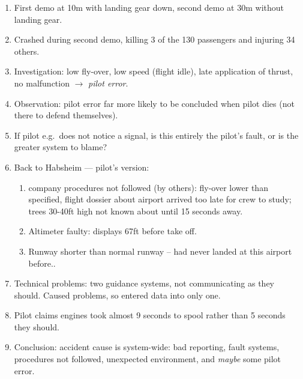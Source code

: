 \documentclass[11pt]{article}
\begin{document}
\begin{enumerate}
\begin{enumerate}
  \item First demo at 10m with landing gear down, second demo at 30m without landing gear. 

  \item Crashed during second demo, killing 3 of the 130 passengers and injuring 34 others.

 \item Investigation: low fly-over, low speed (flight idle), late application of thrust, no malfunction $\rightarrow$ \emph{pilot error}.

 \item Observation: pilot error far more likely to be concluded when pilot dies (not there to defend themselves).

 \item If pilot e.g.\ does not notice a signal, is this entirely the pilot's fault, or is the greater system to blame?

 \item Back to Habsheim --- pilot's version: 

  \begin{enumerate}

   \item company procedures not followed (by others): fly-over lower than specified, flight dossier about airport arrived too late for crew to study; trees 30-40ft high not known about until 15 seconds away.

   \item Altimeter faulty: displays 67ft before take off.

  \item Runway shorter than normal runway -- had never landed at this airport before..

  \end{enumerate}

  \item Technical problems: two guidance systems, not communicating as they should. Caused problems, so entered data into only one.

  \item Pilot claims engines took almost 9 seconds to spool rather than 5 seconds they should.

 \item Conclusion: accident cause is system-wide: bad reporting, fault systems, procedures not followed, unexpected environment, and \emph{maybe} some pilot error.

  \end{enumerate}



\end{enumerate}
\end{document}
